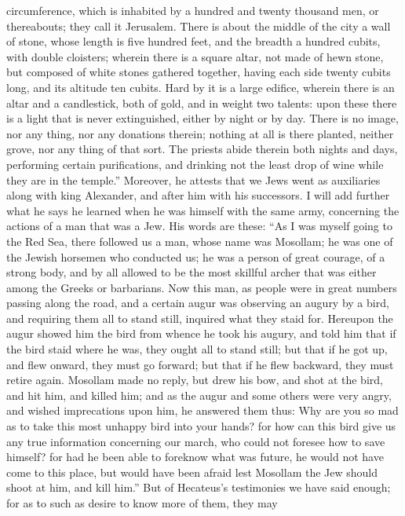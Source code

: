 circumference, which is inhabited by a hundred and twenty thousand men, or
thereabouts; they call it Jerusalem. There is about the middle of the city
a wall of stone, whose length is five hundred feet, and the breadth a
hundred cubits, with double cloisters; wherein there is a square altar,
not made of hewn stone, but composed of white stones gathered together,
having each side twenty cubits long, and its altitude ten cubits. Hard by
it is a large edifice, wherein there is an altar and a candlestick, both
of gold, and in weight two talents: upon these there is a light that is
never extinguished, either by night or by day. There is no image, nor any
thing, nor any donations therein; nothing at all is there planted, neither
grove, nor any thing of that sort. The priests abide therein both nights
and days, performing certain purifications, and drinking not the least
drop of wine while they are in the temple.'' Moreover, he attests that we
Jews went as auxiliaries along with king Alexander, and after him with his
successors. I will add further what he says he learned when he was himself
with the same army, concerning the actions of a man that was a Jew. His
words are these: ``As I was myself going to the Red Sea, there followed us
a man, whose name was Mosollam; he was one of the Jewish horsemen who
conducted us; he was a person of great courage, of a strong body, and by
all allowed to be the most skillful archer that was either among the
Greeks or barbarians. Now this man, as people were in great numbers
passing along the road, and a certain augur was observing an augury by a
bird, and requiring them all to stand still, inquired what they staid for.
Hereupon the augur showed him the bird from whence he took his augury, and
told him that if the bird staid where he was, they ought all to stand
still; but that if he got up, and flew onward, they must go forward; but
that if he flew backward, they must retire again. Mosollam made no reply,
but drew his bow, and shot at the bird, and hit him, and killed him; and
as the augur and some others were very angry, and wished imprecations upon
him, he answered them thus: Why are you so mad as to take this most
unhappy bird into your hands? for how can this bird give us any true
information concerning our march, who could not foresee how to save
himself? for had he been able to foreknow what was future, he would not
have come to this place, but would have been afraid lest Mosollam the Jew
should shoot at him, and kill him.'' But of Hecateus's testimonies we have
said enough; for as to such as desire to know more of them, they may
